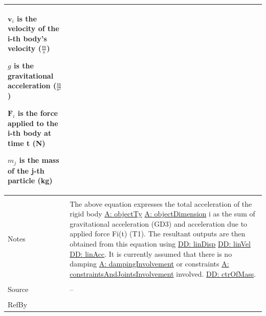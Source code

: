 \documentclass[12pt]{article}
\begin{document}
\begin{minipage}{\textwidth}
\begin{tabular}{>{\raggedright}p{}>{\raggedright\arraybackslash}p{}}
\begin{symbDescription}
              \item{${\mathbf{v}_{i}}$ is the velocity of the i-th body's velocity ($\frac{\text{m}}{\text{s}}$)}
              \item{$g$ is the gravitational acceleration ($\frac{\text{m}}{\text{s}^{2}}$)}
              \item{${\mathbf{F}_{i}}$ is the force applied to the i-th body at time t (N)}
              \item{${m_{j}}$ is the mass of the j-th particle (kg)}
              \end{symbDescription}
\\ \midrule \\
Notes & The above equation expresses the total acceleration of the rigid body \hyperref[assumpOT]{A: objectTy} \hyperref[assumpOD]{A: objectDimension} i as the sum of gravitational acceleration (GD3) and acceleration due to applied force Fi(t) (T1). The resultant outputs are then obtained from this equation using \hyperref[DD:linDisp]{DD: linDisp} \hyperref[DD:linVel]{DD: linVel} \hyperref[DD:linAcc]{DD: linAcc}.  It is currently assumed that there is no damping \hyperref[assumpDI]{A: dampingInvolvement} or constraints \hyperref[assumpCAJI]{A: constraintsAndJointsInvolvement} involved. \hyperref[DD:ctrOfMass]{DD: ctrOfMass}.
\\ \midrule \\
Source & --
\\ \midrule \\
RefBy & 
\\ \bottomrule
\end{tabular}
\end{minipage}
\par~
\end{document}

